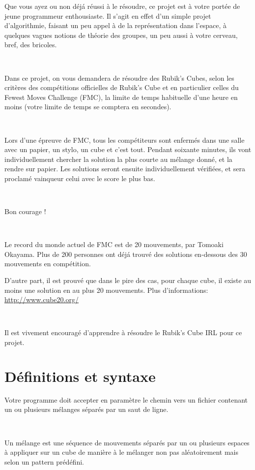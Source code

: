 \documentclass{42}
\begin{document}
Que vous ayez ou non d\'ej\'a r\'eussi \`a le r\'esoudre, ce projet est \`a votre port\'ee de jeune programmeur enthousiaste. Il s'agit en effet d'un simple projet d'algorithmie, faisant un peu appel \`a de la repr\'esentation dans l'espace, \`a quelques vagues notions de th\'eorie des groupes, un peu aussi \`a votre cerveau, bref, des bricoles.

\

Dans ce projet, on vous demandera de r\'esoudre des Rubik's Cubes, selon les crit\`eres des comp\'etitions officielles de Rubik's Cube et en particulier celles du Fewest Moves Challenge (FMC), la limite de temps habituelle d'une heure en moins (votre limite de temps se comptera en secondes).

\

Lors d'une \'epreuve de FMC, tous les comp\'etiteurs sont enferm\'es dans une salle avec un papier, un stylo, un cube et c'est tout. Pendant soixante minutes, ils vont individuellement chercher la solution la plus courte au m\'elange donn\'e, et la rendre sur papier. Les solutions seront ensuite individuellement v\'erifi\'ees, et sera proclam\'e vainqueur celui avec le score le plus bas.

\

Bon courage !

\

\info
{
Le record du monde actuel de FMC est de 20 mouvements, par Tomoaki Okayama. Plus de 200 personnes ont d\'ej\'a trouv\'e des solutions en-dessous des 30 mouvements en comp\'etition.

D'autre part, il est prouv\'e que dans le pire des cas, pour chaque cube, il existe au moins une solution en au plus 20 mouvements. Plus d'informations: \url{http://www.cube20.org/}
}
\

\hint
{
Il est vivement encourag\'e d'apprendre \`a r\'esoudre le Rubik's Cube IRL pour ce projet.
}


%
%

\chapter{D\'efinitions et syntaxe}

Votre programme doit accepter en param\`etre le chemin vers un fichier contenant un ou plusieurs m\'elanges s\'epar\'es par un saut de ligne.

\

Un m\'elange est une s\'equence de mouvements s\'epar\'es par un ou plusieurs espaces \`a appliquer sur un cube de mani\`ere \`a le m\'elanger non pas al\'eatoirement mais selon un pattern pr\'ed\'efini.
\end{document}
